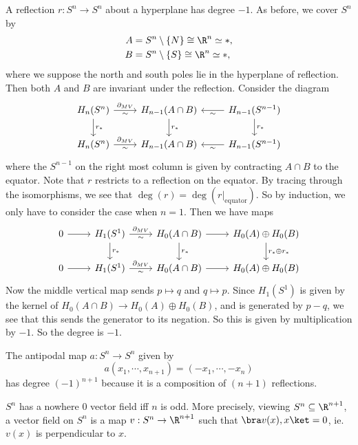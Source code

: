 \documentclass[a4paper]{article}
\theoremstyle{definition}
\begin{document}
\begin{prop}
  A reflection $r: S^n \to S^n$ about a hyperplane has degree $-1$. As before, we cover $S^n$ by
  \begin{align*}
    A &= S^n \setminus \{N\} \cong \R^n \simeq *,\\
    B &= S^n \setminus \{S\} \cong \R^n \simeq *,
  \end{align*}
  where we suppose the north and south poles lie in the hyperplane of reflection. Then both $A$ and $B$ are invariant under the reflection. Consider the diagram
  \[
    \begin{tikzcd}
      H_n(S^n) \ar[r, "\partial_{MV}", "\sim"'] \ar[d, "r_*"] & H_{n - 1}(A \cap B) \ar[d, "r_*"] & H_{n - 1}(S^{n - 1}) \ar[l, "\sim"] \ar[d, "r_*"]\\
      H_n(S^n) \ar[r, "\partial_{MV}", "\sim"'] & H_{n - 1}(A \cap B) & H_{n - 1}(S^{n - 1}) \ar[l, "\sim"]
    \end{tikzcd}
  \]
  where the $S^{n - 1}$ on the right most column is given by contracting $A \cap B$ to the equator. Note that $r$ restricts to a reflection on the equator. By tracing through the isomorphisms, we see that $\deg(r) = \deg(r|_{\mathrm{equator}})$. So by induction, we only have to consider the case when $n = 1$. Then we have maps
  \[
    \begin{tikzcd}
      0 \ar[r] & H_1(S^1) \ar[r, "\partial_{MV}", "\sim"'] \ar[d, "r_*"] & H_0(A \cap B) \ar[d, "r_*"] \ar[r] & H_0(A) \oplus H_0(B) \ar[d, "r_* \oplus r_*"]\\
      0 \ar[r] & H_1(S^1) \ar[r, "\partial_{MV}", "\sim"'] & H_0(A \cap B) \ar[r] & H_0(A) \oplus H_0(B)
    \end{tikzcd}
  \]
  Now the middle vertical map sends $p \mapsto q$ and $q \mapsto p$. Since $H_1(S^1)$ is given by the kernel of $H_0(A \cap B) \to H_0(A) \oplus H_0(B)$, and is generated by $p - q$, we see that this sends the generator to its negation. So this is given by multiplication by $-1$. So the degree is $-1$.
\end{prop}

\begin{cor}
  The antipodal map $a: S^n \to S^n$ given by
  \[
    a(x_1, \cdots, x_{n + 1}) = (-x_1, \cdots, -x_n)
  \]
  has degree $(-1)^{n + 1}$ because it is a composition of $(n + 1)$ reflections.
\end{cor}

\begin{cor}
  $S^n$ has a nowhere $0$ vector field iff $n$ is odd. More precisely, viewing $S^n \subseteq \R^{n + 1}$, a vector field on $S^n$ is a map $v: S^n \to \R^{n + 1}$ such that $\bra v(x), x\ket = 0$, ie. $v(x)$ is perpendicular to $x$.
\end{cor}
\end{document}
